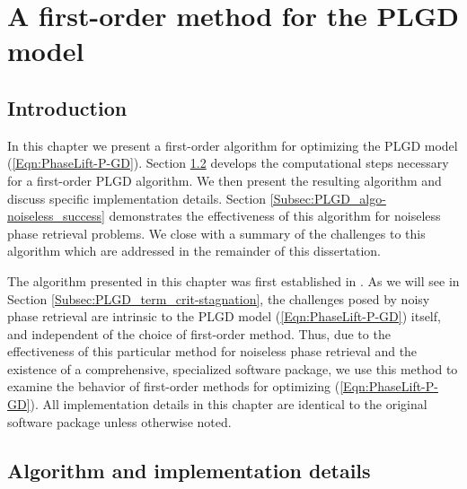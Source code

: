 \chapter{A first-order method for the PLGD model}  \label{Sec:PLGD_algo}



\section{Introduction}		\label{Subsec:PLGD_algo-intro}


In this chapter we present a first-order algorithm for optimizing the PLGD model (\ref{Eqn:PhaseLift-P-GD}).  Section \ref{Subsec:PLGD_algo-algo} develops the computational steps necessary for a first-order PLGD algorithm.  We then present the resulting algorithm and discuss specific implementation details.  Section \ref{Subsec:PLGD_algo-noiseless_success} demonstrates the effectiveness of this algorithm for noiseless phase retrieval problems.  We close with a summary of the challenges to this algorithm which are addressed in the remainder of this dissertation.

The algorithm presented in this chapter was first established in \cite{DBLP:journals/siamsc/FriedlanderM16}.  As we will see in Section \ref{Subsec:PLGD_term_crit-stagnation}, the challenges posed by noisy phase retrieval are intrinsic to the PLGD model (\ref{Eqn:PhaseLift-P-GD}) itself, and independent of the choice of first-order method.  Thus, due to the effectiveness of this particular method for noiseless phase retrieval and the existence of a comprehensive, specialized software package, we use this method to examine the behavior of first-order methods for optimizing (\ref{Eqn:PhaseLift-P-GD}).  All implementation details in this chapter are identical to the original software package unless otherwise noted.





\section{Algorithm and implementation details}  	\label{Subsec:PLGD_algo-algo}



